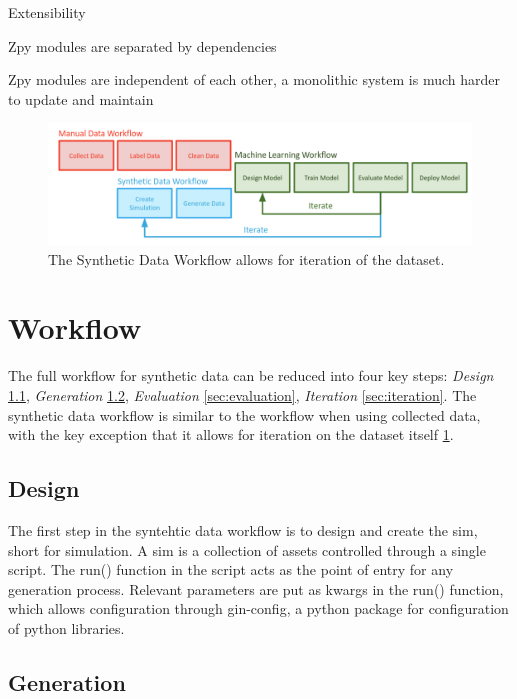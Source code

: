 \documentclass{article}
\begin{document}
Extensibility

Zpy modules are separated by dependencies

Zpy modules are independent of each other, a monolithic system is much harder to update and maintain


\begin{figure}
	\centering
	\includegraphics[width=\textwidth]{workflow.png}
	\caption{The Synthetic Data Workflow allows for iteration of the dataset.}
	\label{fig:workflow}
\end{figure}

\section{Workflow}
\label{sec:workflow}

The full workflow for synthetic data can be reduced into four key steps: \emph{Design} \ref{sec:worflowdesign}, \emph{Generation} \ref{sec:generation}, \emph{Evaluation} \ref{sec:evaluation}, \emph{Iteration} \ref{sec:iteration}. The synthetic data workflow is similar to the workflow when using collected data, with the key exception that it allows for iteration on the dataset itself \ref{fig:workflow}.

\subsection{Design}
\label{sec:worflowdesign}

The first step in the syntehtic data workflow is to design and create the sim, short for simulation. A sim is a collection of assets controlled through a single script. The run() function in the script acts as the point of entry for any generation process. Relevant parameters are put as kwargs in the run() function, which allows configuration through gin-config, a python package for configuration of python libraries.

\subsection{Generation}
\label{sec:generation}
\end{document}
